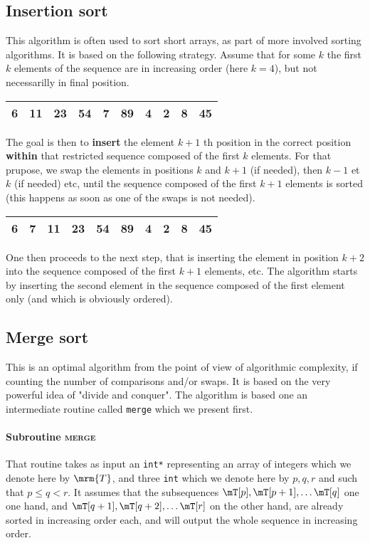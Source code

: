 \documentclass[a4paper,12pt]{article}
\begin{document}
\subsection{Insertion sort}
This algorithm is often used to sort short arrays, as part of more involved sorting algorithms. It is based on the following strategy. Assume that for some $k$ the first $k$ elements of the sequence are in increasing order (here $k=4$), but not necessarilly in final position. 
\begin{center}
  \begin{tabular}{|c|c|c|c|c|c|c|c|c|c|}
    \hline 6 & 11 & 23 & 54 & 7 & 89 & 4 & 2 & 8 & 45 \\ \hline
  \end{tabular}
\end{center}
The goal is then to {\bf insert} the element $k+1$ th position in the correct position
{\bf within} that restricted sequence composed of the first $k$ elements. For that 
prupose, we swap the elements in positions $k$ and $k+1$ (if needed), then $k-1$ et $k$ (if needed) etc, 
until the sequence composed of the first $k+1$ elements is sorted (this happens as soon as one of the swaps is not needed).
\begin{center}
  \begin{tabular}{|c|c|c|c|c|c|c|c|c|c|}
    \hline 6 & 7 & 11 & 23 & 54 & 89 & 4 & 2 & 8 & 45 \\ \hline
  \end{tabular}
\end{center}
One then proceeds to the next step, that is inserting the element in position $k+2$ into the sequence 
composed of the first $k+1$ elements, etc. The algorithm starts by inserting the second element in the sequence composed of the first element only (and which is obviously ordered).

\subsection{Merge sort}
This is an optimal algorithm from the point of view of algorithmic complexity, if counting the number of comparisons and/or swaps. It is based on the very powerful idea of "divide and conquer". The algorithm is based one an  intermediate routine called \verb?merge? which we present first. 


\paragraph{Subroutine \textsc{merge}} That routine takes as input 
 an \verb?int*? representing an array of integers which we denote here by $\mrm{T}$,
and three \verb?int? which we denote here by $p,q,r$ and such that $p\leq q < r$. It assumes that the subsequences  
$\mT[p],\mT[p+1],\dots\mT[q]$ one one hand, and $\mT[q+1],\mT[q+2],\dots\mT[r]$ on the other hand, are already sorted in increasing order each, and will output the whole sequence in increasing order.
\end{document}
